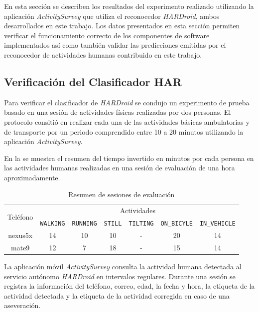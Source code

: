 \label{sec6:resultados}En esta sección se describen los resultados
del experimento realizado utilizando la aplicación \emph{ActivitySurvey}
que utiliza el reconocedor \emph{HARDroid}, ambos desarrollados en
este trabajo. Los datos presentados en esta sección permiten verificar
el funcionamiento correcto de los componentes de software implementados
así como también validar las predicciones emitidas por el reconocedor
de actividades humanas contribuido en este trabajo.

\subsection{Verificación del Clasificador HAR}

Para verificar el clasificador  de \emph{HARDroid }se condujo
un experimento de prueba basado en una sesión de actividades físicas
realizadas por dos personas. El protocolo consitió en realizar cada
una de las actividades básicas ambulatorias y de transporte por un
periodo comprendido entre 10 a 20 minutos utilizando la aplicación
\emph{ActivitySurvey}. 

En la  se muestra el resumen del tiempo invertido
en minutos por cada persona en las actividades humanas realizadas
en una sesión de evaluación de una hora aproximadamente.

\begin{table}[th]
\begin{centering}
\begin{tabular}{|c|c|c|c|c|c|c|}
\hline 
\multirow{2}{*}{Teléfono} & \multicolumn{6}{c|}{Actividades}\tabularnewline
\cline{2-7} 
 & \texttt{\footnotesize{}WALKING} & \texttt{\footnotesize{}RUNNING} & \texttt{\footnotesize{}STILL} & \texttt{\footnotesize{}TILTING} & \texttt{\footnotesize{}ON\_BICYLE} & \texttt{\footnotesize{}IN\_VEHICLE}\tabularnewline
\hline 
\hline 
nexus5x & 14 & 10 & 10 & - & 20 & 14\tabularnewline
\hline 
mate9 & 12 & 7 & 18 & - & 15 & 14\tabularnewline
\hline 
\end{tabular}
\par\end{centering}
\caption{\label{tab6:vsesiones}Resumen de sesiones de evaluación}
\end{table}

La aplicación móvil \emph{ActivitySurvey} consulta la actividad humana
detectada al servicio autónomo \emph{HARDroid} en intervalos regulares.
Durante una sesión se registra la información del teléfono, correo,
edad, la fecha y hora, la etiqueta de la actividad detectada y la
etiqueta de la actividad corregida en caso de una aseveración. 

